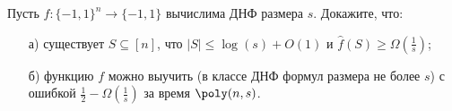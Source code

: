\begin{ptask}{27}
    Пусть $f:\{-1, 1\}^n \to \{-1, 1\}$ вычислима ДНФ размера $s$. Докажите, что:
   	\begin{enumerate}[topsep = 0pt, itemsep = -1ex]
        \item [а)] существует $S \subseteq [n]$, что $|S| \le \log(s) + O(1)$ и $\hat{f}(S) \ge \Omega(\frac{1}{s})$;
        \item [б)] функцию $f$ можно выучить (в классе ДНФ формул размера не более $s$) с ошибкой $\frac{1}{2} -
            \Omega(\frac{1}{s})$ за время $\poly(n, s)$.
	\end{enumerate}
\end{ptask}


